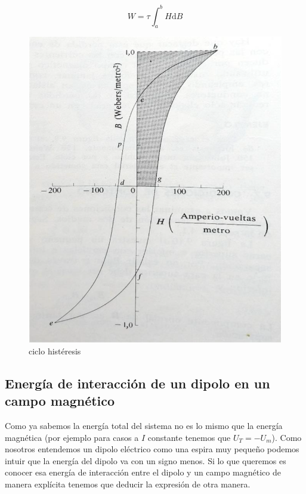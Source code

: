 \documentclass[12pt]{article}
\newcommand{\D}{\mathrm{d}}
\begin{document}
\begin{equation}
W = \tau \int_a^b H \D B
\end{equation}




\begin{figure}[h!]
    \centering
    \includegraphics[scale=0.5]{histeresis.png}
    \caption{ciclo histéresis}
\end{figure}

\subsection{Energía de interacción de un dipolo en un campo magnético}

Como ya sabemos la energía total del sistema no es lo mismo que la energía magnética (por ejemplo para casos a $I$ constante tenemos que $U_T = - U_m$). Como nosotros entendemos un dipolo eléctrico como una espira muy pequeño podemos intuir que la energía del dipolo va con un signo menos. Si lo que queremos es conocer esa energía de interacción entre el dipolo y un campo magnético de manera explícita tenemos que deducir la expresión de otra manera. \\
\end{document}
